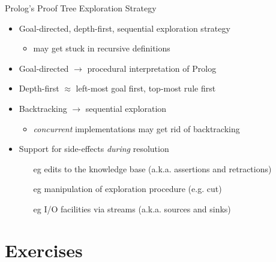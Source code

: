 \documentclass[presentation]{beamer}\mode<presentation>{\usetheme{AMSBolognaFC}}
\begin{document}
\begin{frame}{Prolog's Proof Tree Exploration Strategy}
    \begin{itemize}
        \item Goal-directed, depth-first, sequential exploration strategy
        \begin{itemize}
            \item may get stuck in recursive definitions
        \end{itemize}

        \vfill

        \item Goal-directed $\rightarrow$ \alert{procedural} interpretation of Prolog

        \vfill

        \item Depth-first $\approx$ \alert{left-most} goal first, \alert{top-most} rule first

        \vfill

        \item \alert{Backtracking} $\rightarrow$ sequential exploration
        \begin{itemize}
            \item \emph{concurrent} implementations may get rid of backtracking
        \end{itemize}

        \vfill

        \item Support for \alert{side-effects} \emph{during} resolution
        \begin{itemize}
            \item[eg] edits to the knowledge base (a.k.a. assertions and retractions)
            \item[eg] manipulation of exploration procedure (e.g. cut)
            \item[eg] I/O facilities via streams (a.k.a. sources and sinks)
        \end{itemize}
    \end{itemize}
\end{frame}

\section{Exercises}
\end{document}
